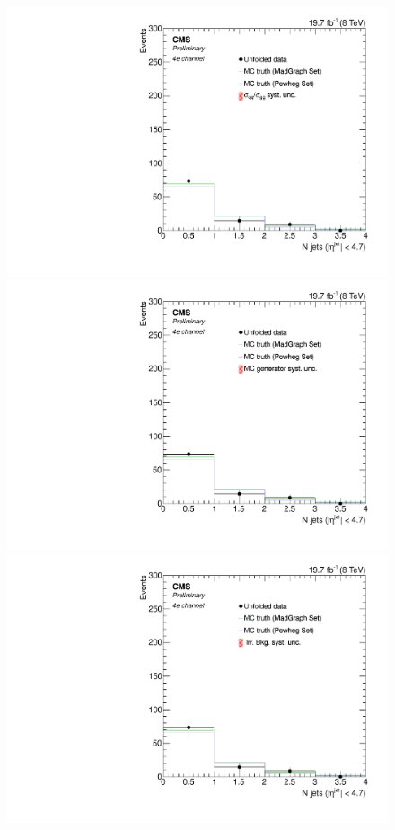 \begin{figure}[hbtp]
  \begin{center}
    \includegraphics[width=0.8\cmsFigWidth]{Figures/Unfolding/Systematics/ZZTo4e_Jets_qqgg_Mad_fr}     
    \includegraphics[width=0.8\cmsFigWidth]{Figures/Unfolding/Systematics/ZZTo4e_Jets_MCgen_Mad_fr}     
    \includegraphics[width=0.8\cmsFigWidth]{Figures/Unfolding/Systematics/ZZTo4e_Jets_IrrBkg_Mad_fr}

\end{center}
\end{figure}
